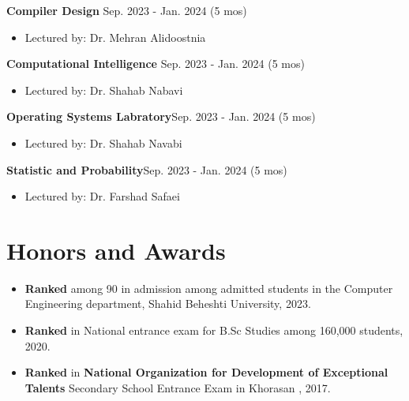 \documentclass[11pt,a4paper,sans]{moderncv}        %
\begin{document}

    \item \textbf{Compiler Design} \hfill Sep. 2023 - Jan. 2024 (5 mos)
    \begin{itemize}
        \item Lectured by: Dr. Mehran Alidoostnia
    \end{itemize}

    \item \textbf{Computational Intelligence} \hfill Sep. 2023 - Jan. 2024 (5 mos)
    \begin{itemize}
        \item Lectured by: Dr. Shahab Nabavi
    \end{itemize}

    \item \textbf{Operating Systems Labratory}\hfill Sep. 2023 - Jan. 2024 (5 mos)
    \begin{itemize}
        \item Lectured by: Dr. Shahab Navabi
    \end{itemize}

\item \textbf{Statistic and Probability}\hfill Sep. 2023 - Jan. 2024 (5 mos)
    \begin{itemize}
        \item Lectured by: Dr. Farshad Safaei

\end{itemize}


\section{Honors and Awards}

\vspace{4pt}

\begin{itemize}
\item \textbf{Ranked } among 90 in admission among admitted students in the Computer Engineering department, Shahid Beheshti University, 2023.
\end{itemize}

\begin{itemize}
\item \textbf{Ranked }{in National entrance exam for B.Sc Studies among 160,000 students, 2020.}
\end{itemize}
\begin{itemize}
\item \textbf{Ranked }{{in \textbf{National Organization for Development of Exceptional Talents} Secondary School Entrance Exam in Khorasan }, 2017.}
\end{itemize}



  
  
\end{document}
